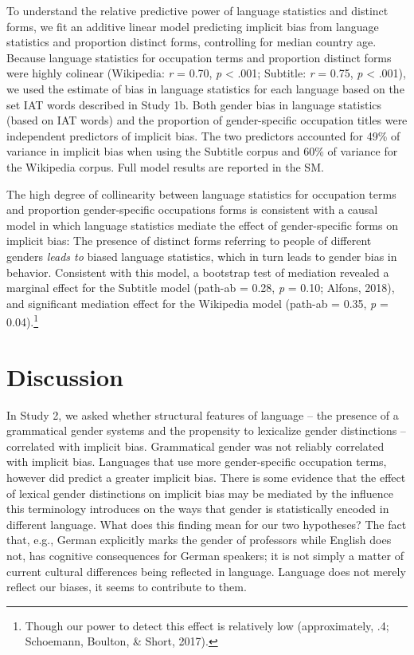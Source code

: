 \documentclass[man,floatsintext]{apa6}
\let\rmarkdownfootnote\footnote%
\def\footnote{\protect\rmarkdownfootnote}
\begin{document}
To understand the relative predictive power of language statistics and distinct forms, we fit an additive linear model predicting implicit bias from language statistics and proportion distinct forms, controlling for median country age. Because language statistics for occupation terms and proportion distinct forms were highly colinear (Wikipedia: \emph{r} = 0.70, \emph{p} \textless{} .001; Subtitle: \emph{r} = 0.75, \emph{p} \textless{} .001), we used the estimate of bias in language statistics for each language based on the set IAT words described in Study 1b. Both gender bias in language statistics (based on IAT words) and the proportion of gender-specific occupation titles were independent predictors of implicit bias. The two predictors accounted for 49\% of variance in implicit bias when using the Subtitle corpus and 60\% of variance for the Wikipedia corpus. Full model results are reported in the SM.

The high degree of collinearity between language statistics for occupation terms and proportion gender-specific occupations forms is consistent with a causal model in which language statistics mediate the effect of gender-specific forms on implicit bias: The presence of distinct forms referring to people of different genders \emph{leads to} biased language statistics, which in turn leads to gender bias in behavior. Consistent with this model, a bootstrap test of mediation revealed a marginal effect for the Subtitle model (path-ab = 0.28, \emph{p} = 0.10; Alfons, 2018), and significant mediation effect for the Wikipedia model (path-ab = 0.35, \emph{p} = 0.04).\footnote{Though our power to detect this effect is relatively low (approximately, .4; Schoemann, Boulton, \& Short, 2017).}

\hypertarget{discussion-1}{%
\section{Discussion}\label{discussion-1}}

In Study 2, we asked whether structural features of language -- the presence of a grammatical gender systems and the propensity to lexicalize gender distinctions -- correlated with implicit bias. Grammatical gender was not reliably correlated with implicit bias. Languages that use more gender-specific occupation terms, however did predict a greater implicit bias. There is some evidence that the effect of lexical gender distinctions on implicit bias may be mediated by the influence this terminology introduces on the ways that gender is statistically encoded in different language. What does this finding mean for our two hypotheses? The fact that, e.g., German explicitly marks the gender of professors while English does not, has cognitive consequences for German speakers; it is not simply a matter of current cultural differences being reflected in language. Language does not merely reflect our biases, it seems to contribute to them.
\end{document}

